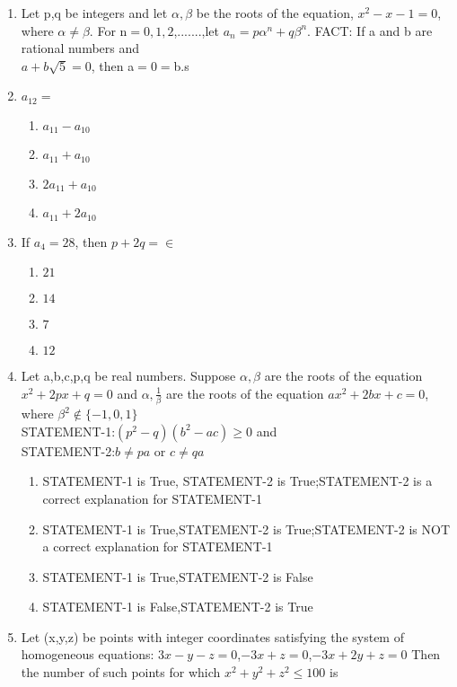 \documentclass[journal,12pt,twocolumn]{IEEEtran}
\begin{document}
\begin{enumerate}[label=\arabic*]
\item Let p,q be integers and let $\alpha,\beta$ be the roots of the equation, $x^2-x-1=0$, where $\alpha\neq\beta$. For n$=0,1,2$,.......,let $a_n=p\alpha^n+q\beta^n$.
FACT: If a and b are rational numbers and \\$a+b\sqrt5=0$, then a$=0=$b.s

\item $a_{12} =$
\begin{enumerate}
\item $a_{11}-a_{10}$
\item $a_{11}+a_{10}$ 
\item $2a_{11}+a_{10}$
\item $a_{11}+2a_{10}$
\end{enumerate}

\item If $a_4 =28$, then $p+2q=\in$
\begin{enumerate}
\item $21$
\item $14$ 
\item $7$
\item $12$ 
\end{enumerate}

\item Let a,b,c,p,q be real numbers. Suppose $\alpha,\beta$ are the roots of the equation $x^2+2px+q=0$ and $\alpha, \frac{1}{\beta}$ are the roots of the equation $ax^2 +2bx+c=0$, where $\beta^2{\notin\lbrace-1,0,1\rbrace}$\\
         STATEMENT-1:$(p^2-q)(b^2-ac)\geq0$
          and\\
         STATEMENT-2:$b\neq{pa}$ or $c\neq{qa}$
\begin{enumerate}
\item STATEMENT-1 is True, STATEMENT-2 is True;STATEMENT-2 is a correct explanation for STATEMENT-1
\item STATEMENT-1 is True,STATEMENT-2 is True;STATEMENT-2 is NOT a correct explanation for STATEMENT-1
\item STATEMENT-1 is True,STATEMENT-2 is False
\item STATEMENT-1 is False,STATEMENT-2 is True
\end{enumerate}

\item Let (x,y,z) be points with integer coordinates satisfying the system of homogeneous equations:
$3x-y-z=0$,$-3x+z=0$,$-3x+2y+z=0$ Then the number of such points for which $x^2+y^2+z^2\leq100$ is


\end{enumerate}
\end{document}
